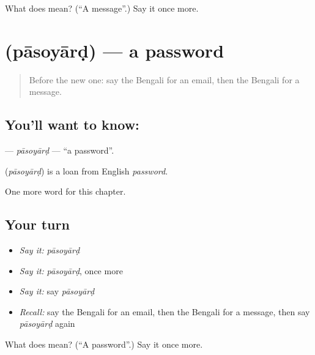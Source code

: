 \begin{tcolorbox}[breakable,colback=teal!4,colframe=teal!35!black,title={Before you move on}]
What does  mean? (\textquotedblleft{}A message\textquotedblright{}.) Say it once more.
\end{tcolorbox}
\section[\texorpdfstring{\bn{পাসওয়ার্ড} (pāsoyārḍ)}{পাসওয়ার্ড (pāsoyārḍ)}]{ (pāsoyārḍ) — a password}

\label{lesson:BN-C258-pasoyard}



\begin{quote}
Before the new one: say the Bengali for an email, then the Bengali for a message.
\end{quote}

\subsection*{You'll want to know: }
\textbf{} — \emph{pāsoyārḍ} — \textquotedblleft{}a password\textquotedblright{}.

\begin{cousinweb}
\textbf{} (\emph{pāsoyārḍ}) is a loan from English \emph{password}.
\end{cousinweb}

\begin{grammarlens}[title={What you've built}]
One more word for this chapter.
\end{grammarlens}

\subsection*{Your turn}
\begin{itemize}
\raggedright
  \item \emph{Say it:} \emph{pāsoyārḍ}
  \item \emph{Say it:} \emph{pāsoyārḍ}, once more
  \item \emph{Say it:} say \emph{pāsoyārḍ}
  \item \emph{Recall:} say the Bengali for an email, then the Bengali for a message, then say \emph{pāsoyārḍ} again
\end{itemize}

\begin{tcolorbox}[breakable,colback=teal!4,colframe=teal!35!black,title={Before you move on}]
What does  mean? (\textquotedblleft{}A password\textquotedblright{}.) Say it once more.
\end{tcolorbox}
